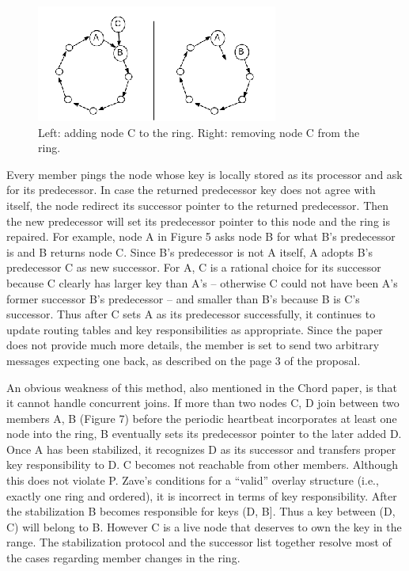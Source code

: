 \documentclass[fleqn,24pt]{SelfArx} %
\begin{document}
\begin{figure}[!htb]
\includegraphics{figure5.png}
\caption{\label{family}Left: adding node C to the ring. Right: removing node C from the ring.}
\label{56}
\end{figure}

Every member pings the node whose key is locally stored as its processor and ask for its predecessor. In case the returned predecessor key does not agree with itself, the node redirect its successor pointer to the returned predecessor. Then the new predecessor will set its predecessor pointer to this node and the ring is repaired. For example, node A in Figure 5 asks node B for what B's predecessor is and B returns node C. Since B's predecessor is not A itself, A adopts B's predecessor C as new successor. For A, C is a rational choice for its successor because C clearly has larger key than A's – otherwise C could not have been A's former successor B's predecessor – and smaller than B's because B is C's successor. Thus after C sets A as its predecessor successfully, it continues to update routing tables and key responsibilities as appropriate. Since the paper does not provide much more details, the member is set to send two arbitrary messages expecting one back, as described on the page 3 of the proposal.

An obvious weakness of this method, also mentioned in the Chord paper, is that it cannot handle concurrent joins. If more than two nodes C, D join between two members A, B (Figure 7) before the periodic heartbeat incorporates at least one node into the ring, B eventually sets its predecessor pointer to the later added D. Once A has been stabilized, it recognizes D as its successor and transfers proper key responsibility to D. C becomes not reachable from other members. Although this does not violate P. Zave's conditions for a “valid” overlay structure (i.e., exactly one ring and ordered), it is incorrect in terms of key responsibility. After the stabilization B becomes responsible for keys (D, B]. Thus a key between (D, C) will belong to B. However C is a live node that deserves to own the key in the range. The stabilization protocol and the successor list together resolve most of the cases regarding member changes in the ring. 
\end{document}
